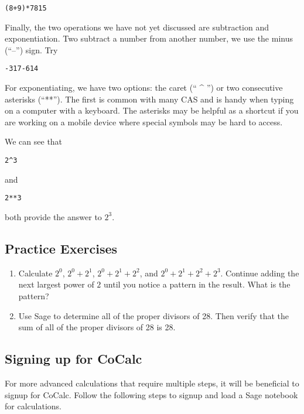 \documentclass[12pt]{amsart}
\theoremstyle{definition}
\theoremstyle{definition}
\begin{document}
\begin{verbatim}
(8+9)*7815
\end{verbatim}

Finally, the two operations we have not yet discussed are
subtraction  and exponentiation. Two
subtract a number from another number, we use the minus
(``--'') sign. Try

\begin{verbatim}
-317-614
\end{verbatim}

For exponentiating, we have two options:  the caret (`` \^{} '') or 
two consecutive asterisks (``**''). The first is common with many
CAS and is handy when typing on a computer with a keyboard.
The asterisks may be helpful as a shortcut if you are working
on a mobile device where special symbols may be hard to access.

We can see that

\begin{verbatim}
2^3
\end{verbatim}

and

\begin{verbatim}
2**3
\end{verbatim}

both provide the answer to $2^3$.

\subsection{Practice Exercises}

\begin{enumerate}
	\item Calculate $2^0$, $2^0+2^1$, $2^0+2^1+2^2$, 
		and $2^0+2^1+2^2+2^3$. Continue adding the next
		largest power of $2$ until you notice a pattern in the
		result. What is the pattern?
	\item Use Sage to determine all of the proper divisors of 28.
		Then verify that the sum of all of the proper divisors of
		28 is 28.
\end{enumerate}

\subsection{Signing up for CoCalc}

For more advanced calculations that require multiple
steps, it will be beneficial to signup for CoCalc. Follow the following
steps to signup and load a Sage notebook for calculations.
\end{document}
